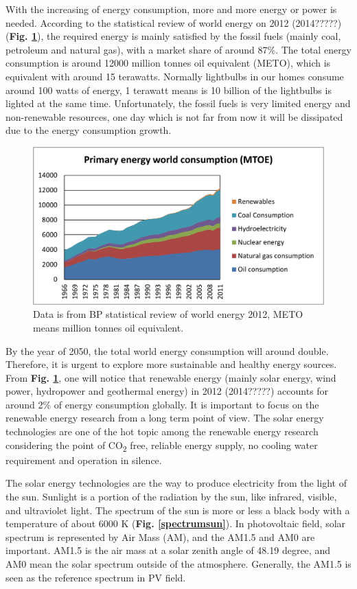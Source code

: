 \documentclass[a4paper, 12pt, titlepage,oneside,drop]{kthesis}
\begin{document}
With the increasing of energy consumption, more and more energy or power is needed. According to the statistical review of world energy on 2012 (2014?????) (\textbf{Fig. \ref{wpec}}),
the required energy is mainly satisfied by the fossil fuels (mainly coal, petroleum and 
natural gas), with a market share of around 87\%. The total energy consumption is around 12000 million tonnes oil equivalent (METO), which is equivalent with around 15 terawatts. 
Normally lightbulbs in our homes consume around 100 watts of energy, 1 terawatt means is 10 billion of the lightbulbs is lighted at the same time. 
Unfortunately, the fossil fuels is very limited energy and non-renewable resources, one day which is not far from  now it will be dissipated due to the energy consumption growth.

\begin{figure}[H]
\centering
\includegraphics[scale=0.4]{world_Consumption.pdf}
\caption{Data is from BP statistical review of world energy 2012, METO means million tonnes oil equivalent.}
\label{wpec}
\end{figure}

By the year of 2050, the total world energy consumption will around double. Therefore, it is urgent to explore more sustainable and healthy energy sources. From \textbf{Fig. \ref{wpec}}, one will notice that renewable energy (mainly solar energy, wind power, hydropower and 
geothermal energy) in 2012 (2014?????) accounts for around 2\% of energy consumption globally. It is important to focus on the renewable energy research from a long term point of view.
The solar energy technologies are one of the hot topic among the renewable energy research considering the point of CO\textsubscript{2} free, reliable energy supply, no cooling water requirement and operation in silence.

The solar energy technologies are the way to produce electricity from the light of the sun. Sunlight is a portion of the radiation by the sun, like infrared, visible,
and ultraviolet light. The spectrum of the sun is more or less a black body with a temperature of about 6000 K (\textbf{Fig. \ref{spectrumsun}}). In photovoltaic field, solar spectrum is represented by Air Mass (AM), 
and the AM1.5 and AM0 are important. AM1.5 is the air mass at a solar zenith angle of 48.19 degree, and AM0 mean the solar spectrum outside of the atmosphere. Generally, the AM1.5 is seen as the reference spectrum in PV field.
\end{document}
